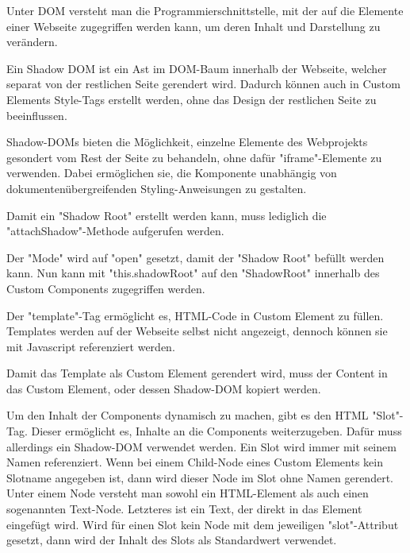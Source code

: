 \pagebreak
{}

Unter DOM versteht man die Programmierschnittstelle, mit der auf die Elemente einer Webseite zugegriffen werden kann, um deren Inhalt und Darstellung zu verändern. \cite{MDNDOM}

Ein Shadow DOM ist ein Ast im DOM-Baum innerhalb der Webseite, welcher separat von der restlichen Seite gerendert wird.
Dadurch können auch in Custom Elements Style-Tags erstellt werden, ohne das Design der restlichen Seite zu beeinflussen. \cite{MDNShadowRoot}

Shadow-DOMs bieten die Möglichkeit, einzelne Elemente des Webprojekts gesondert vom Rest der Seite zu behandeln, ohne dafür "{\ttfamily iframe}"-Elemente zu verwenden. 
Dabei ermöglichen sie, die Komponente unabhängig von dokumentenübergreifenden Styling-Anweisungen zu gestalten. \cite{IONOSShadowDom}

Damit ein "Shadow Root" erstellt werden kann, muss lediglich die "{\ttfamily attachShadow}"-Methode aufgerufen werden. \cite{MDNShadowRoot}


Der "Mode" wird auf "{\ttfamily open}" gesetzt, damit der "Shadow Root" befüllt werden kann. Nun kann mit "{\ttfamily this.shadowRoot}" auf den "ShadowRoot" innerhalb des Custom Components zugegriffen werden.
\cite{MDNShadowRoot}

\pagebreak
{}

Der "template"-Tag ermöglicht es, HTML-Code in Custom Element zu füllen.
Tem\-plates werden auf der Webseite selbst nicht angezeigt, dennoch können sie mit Javascript referenziert werden. \cite{MDNtemplate}


Damit das Template als Custom Element gerendert wird, muss der Content in das Custom Element, oder dessen Shadow-DOM kopiert werden.



Um den Inhalt der Components dynamisch zu machen, gibt es den HTML "Slot"-Tag. 
Dieser ermöglicht es, Inhalte an die Components weiterzugeben. 
Dafür muss allerdings ein Shadow-DOM verwendet werden. 
Ein Slot wird immer mit seinem Namen referenziert. 
Wenn bei einem Child-Node eines Custom Elements kein Slotname angegeben ist, dann wird dieser Node im Slot ohne Namen gerendert. 
Unter einem Node versteht man sowohl ein HTML-Element als auch einen sogenannten Text-Node. 
Letzteres ist ein Text, der direkt in das Element eingefügt wird. 
Wird für einen Slot kein Node mit dem jeweiligen "{\ttfamily slot}"-Attribut gesetzt, dann wird der Inhalt des Slots als Standardwert verwendet. 
\cite{MDNSlots}

